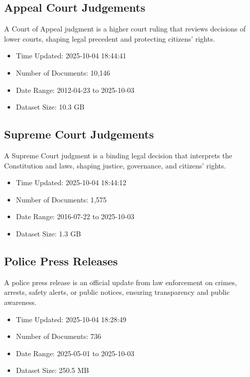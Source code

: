 \documentclass[11pt,a4paper,twocolumn]{article}%
\begin{document}
%
\subsection{Appeal Court Judgements}%
\label{subsec:AppealCourtJudgements}%
A Court of Appeal judgment is a higher court ruling that reviews decisions of lower courts, shaping legal precedent and protecting citizens’ rights.%
\begin{itemize}%
\item%
Time Updated: 2025{-}10{-}04 18:44:41%
\item%
Number of Documents: 10,146%
\item%
Date Range: 2012{-}04{-}23 to 2025{-}10{-}03%
\item%
Dataset Size: 10.3 GB%
\end{itemize}

%
\subsection{Supreme Court Judgements}%
\label{subsec:SupremeCourtJudgements}%
A Supreme Court judgment is a binding legal decision that interprets the Constitution and laws, shaping justice, governance, and citizens’ rights.%
\begin{itemize}%
\item%
Time Updated: 2025{-}10{-}04 18:44:12%
\item%
Number of Documents: 1,575%
\item%
Date Range: 2016{-}07{-}22 to 2025{-}10{-}03%
\item%
Dataset Size: 1.3 GB%
\end{itemize}

%
\subsection{Police Press Releases}%
\label{subsec:PolicePressReleases}%
A police press release is an official update from law enforcement on crimes, arrests, safety alerts, or public notices, ensuring transparency and public awareness.%
\begin{itemize}%
\item%
Time Updated: 2025{-}10{-}04 18:28:49%
\item%
Number of Documents: 736%
\item%
Date Range: 2025{-}05{-}01 to 2025{-}10{-}03%
\item%
Dataset Size: 250.5 MB%
\end{itemize}
\end{document}
